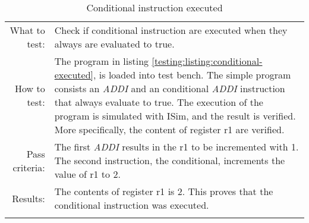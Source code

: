 \begin{table}[H]
  \begin{tabular}{r | p{8cm}}
    \noalign{\smallskip}\hline\noalign{\smallskip}
    
    What to test:  & Check if conditional instruction are executed when they
                     always are evaluated to true.   \\

    \noalign{\smallskip}\hline\noalign{\smallskip}

    How to test:  & The program in listing \ref{testing:listing:conditional-executed}, is loaded into test bench.     The 
                    simple program consists an \emph{ADDI} and  an conditional \emph{ADDI} instruction that
                    always evaluate to true. The execution of the program is simulated with ISim, 
                    and the result is verified. More specifically, the content of register r1 are verified. 
    \\

    \noalign{\smallskip}\hline\noalign{\smallskip}

    Pass criteria: & The first \emph{ADDI} results in the r1 to be incremented with 1. The second
    instruction, the conditional, increments the value of r1 to 2. \\

    \noalign{\smallskip}\hline\noalign{\smallskip}
    
    Results: &  The contents of register r1 is 2. This proves that the conditional instruction was executed. \\
   \noalign{\smallskip}\hline\noalign{\smallskip}
  
  
  
  \end{tabular}
  \caption{Conditional instruction executed }
  \label{testing:fitness:conditional_taken}
\end{table}
